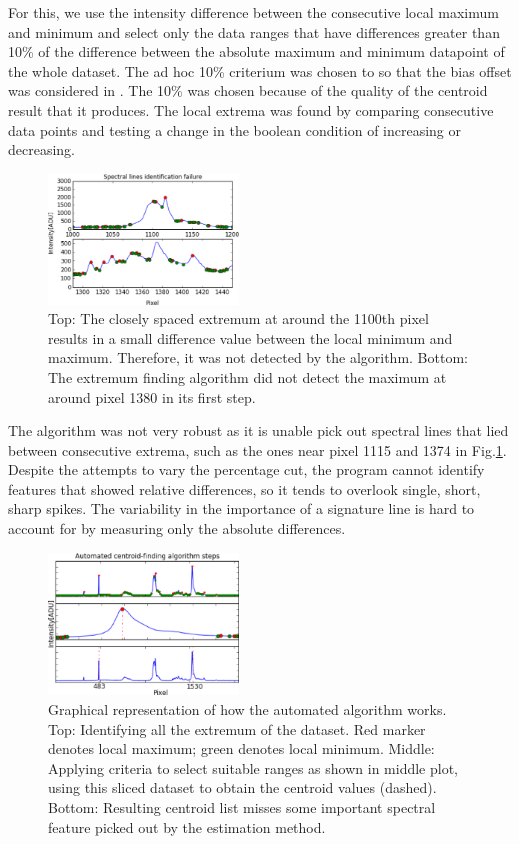 \documentclass[authoryear,12pt,5p,times]{elsarticle}
\begin{document}
 For this, we use the intensity difference between the consecutive  local maximum and minimum and select only the data ranges that  have  differences greater than 10\% of the difference between the absolute maximum and  minimum datapoint of the whole dataset. The ad hoc 10\% criterium was chosen to so that the bias offset  was considered in . The 10\% was chosen because of the quality of the centroid result that it produces. The local extrema was found by comparing consecutive data points and testing a change in the boolean condition of increasing or decreasing.
\begin{figure}
\includegraphics[width=0.45\textwidth]{figures/fail}
\caption{Top: The closely spaced extremum at around the 1100th pixel results in a small difference value between the local minimum and maximum. Therefore, it was not detected by the algorithm. Bottom: The extremum finding algorithm did not detect the maximum at around pixel 1380 in its  first step.}
\end{figure}


	The algorithm was not very robust as it is unable pick out spectral lines that lied between consecutive extrema, such as the ones near pixel 1115 and 1374 in Fig.\ref{fail}. Despite the attempts to vary the percentage cut, the program cannot identify features that showed relative differences, so it tends to overlook single, short, sharp spikes. The variability in the importance of a signature line  is hard to account for  by measuring only the  absolute differences.
\begin{figure}
\includegraphics[width=0.45\textwidth]{figures/steps}
\caption{Graphical representation of how the automated algorithm works. Top: Identifying all the extremum of the dataset. Red marker denotes local maximum; green denotes local minimum. Middle: Applying criteria to select suitable ranges as shown in middle plot, using this sliced dataset to obtain the centroid values (dashed). Bottom: Resulting centroid list misses some important spectral feature picked out by the estimation method.}\label{fail}
\end{figure}
\end{document}
